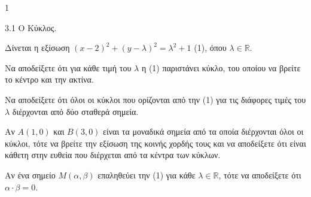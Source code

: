 \begin{ylh}{1}
    \item 3.1 Ο Κύκλος.
\end{ylh}
Δίνεται η εξίσωση $(x - 2)^2 + (y - \lambda)^2 = \lambda^2 + 1$ (1), όπου $\lambda \in \mathbb{R}$.
\begin{alist}
\item Να αποδείξετε ότι για κάθε τιμή του $\lambda$ η (1) παριστάνει κύκλο, του οποίου να βρείτε το κέντρο και την ακτίνα. 
\item Να αποδείξετε ότι όλοι οι κύκλοι που ορίζονται από την (1) για τις διάφορες τιμές του $\lambda$ διέρχονται από δύο σταθερά σημεία. 
\item Αν $A(1,0)$ και $B(3,0)$ είναι τα μοναδικά σημεία από τα οποία διέρχονται όλοι οι κύκλοι, τότε να βρείτε την εξίσωση της κοινής χορδής τους και να αποδείξετε ότι είναι κάθετη στην ευθεία που διέρχεται από τα κέντρα των κύκλων. 
\item Αν ένα σημείο $M(\alpha, \beta)$ επαληθεύει την (1) για κάθε $\lambda \in \mathbb{R}$, τότε να αποδείξετε ότι $\alpha \cdot \beta = 0$. 
\end{alist}